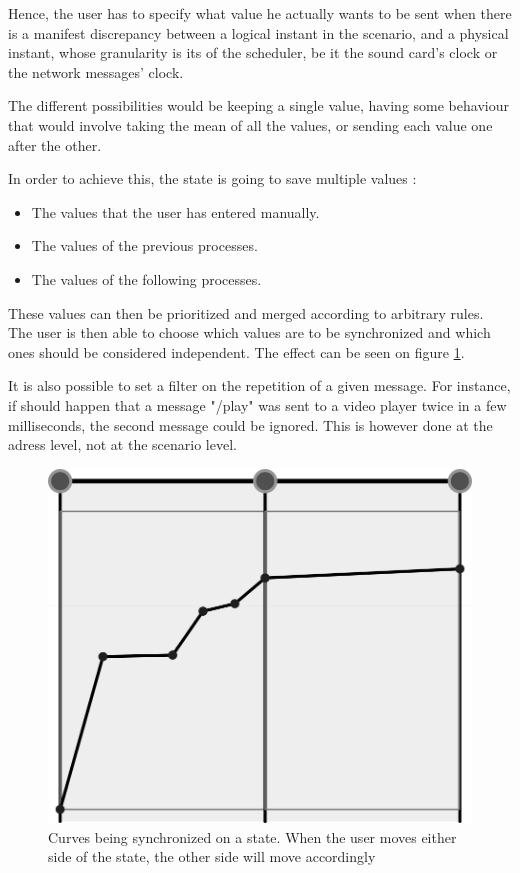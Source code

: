 \documentclass{sigchi}
\begin{document}
Hence, the user has to specify what value he actually wants to be sent when there is a manifest discrepancy between a logical instant in the scenario, and a physical instant, whose granularity is its of the scheduler, be it the sound card's clock or the network messages' clock.

The different possibilities would be keeping a single value, having some behaviour that would involve taking the mean of all the values, or sending each value one after the other.

In order to achieve this, the state is going to save multiple values : 
\begin{itemize}
	\item The values that the user has entered manually.
	\item The values of the previous processes.
	\item The values of the following processes.
\end{itemize}

These values can then be prioritized and merged according to arbitrary rules. The user is then able to choose which values are to be synchronized and which ones should be considered independent. The effect can be seen on figure \ref{fig.curvesync}.

It is also possible to set a filter on the repetition of a given message. For instance, if should happen that a message "/play" was sent to a video player twice in a few milliseconds, the second message could be ignored. This is however done at the adress level, not at the scenario level. 

\begin{figure}[h]
	\centering
	\includegraphics[scale=0.2]{images/curvesync.png}
	\caption{Curves being synchronized on a state. When the user moves either side of the state, the other side will move accordingly}
	\label{fig.curvesync}
\end{figure}
\end{document}
